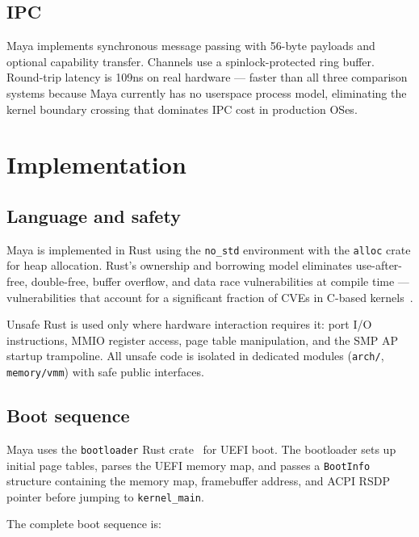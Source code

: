 \documentclass[letterpaper,twocolumn,10pt]{article}
\begin{document}
\subsection{IPC}

Maya implements synchronous message passing
with 56-byte payloads and optional capability
transfer. Channels use a spinlock-protected
ring buffer. Round-trip latency is 109ns on
real hardware --- faster than all three
comparison systems because Maya currently
has no userspace process model, eliminating
the kernel boundary crossing that dominates
IPC cost in production OSes.

\section{Implementation}

\subsection{Language and safety}

Maya is implemented in Rust using the
\texttt{no\_std} environment with the
\texttt{alloc} crate for heap allocation.
Rust's ownership and borrowing model
eliminates use-after-free, double-free,
buffer overflow, and data race vulnerabilities
at compile time --- vulnerabilities that
account for a significant fraction of CVEs
in C-based kernels~\cite{rust-safety}.

Unsafe Rust is used only where hardware
interaction requires it: port I/O instructions,
MMIO register access, page table manipulation,
and the SMP AP startup trampoline. All unsafe
code is isolated in dedicated modules
(\texttt{arch/}, \texttt{memory/vmm}) with
safe public interfaces.

\subsection{Boot sequence}

Maya uses the \texttt{bootloader} Rust
crate~\cite{bootloader} for UEFI boot.
The bootloader sets up initial page tables,
parses the UEFI memory map, and passes a
\texttt{BootInfo} structure containing the
memory map, framebuffer address, and ACPI
RSDP pointer before jumping to
\texttt{kernel\_main}.

The complete boot sequence is:
\end{document}
